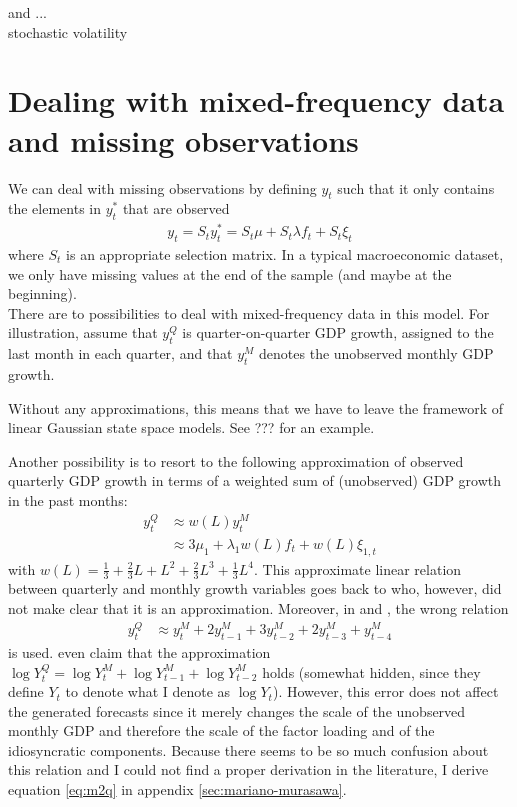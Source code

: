 
\citet{LucianiRicci2014} and \citet{DAgostinoEtal2016} ... \\

\citet{MarcellinoEtal2016} stochastic volatility

\section{Dealing with mixed-frequency data and missing observations}

We can deal with missing observations by defining $y_t$ such that it only contains the elements in $y_t^*$ that are observed
\begin{align}
y_t = S_t y^*_t = S_t\mu + S_t \lambda f_t + S_t \xi_t
\end{align}
where $S_t$ is an appropriate selection matrix. In a typical macroeconomic dataset, we only have missing values at the end of the sample (and maybe at the beginning). \\


There are to possibilities to deal with mixed-frequency data in this model. For illustration, assume that $y_t^Q$ is quarter-on-quarter GDP growth, assigned to the last month in each quarter, and that $y_t^M$ denotes the unobserved monthly GDP growth.  

\citet{ProiettiMoauro2006}
Without any approximations, this means that we have to leave the framework of linear Gaussian state space models. See ??? for an example.

Another possibility is to resort to the following approximation of observed quarterly GDP growth in terms of a weighted sum of (unobserved) GDP growth in the past months:
\begin{align}
y^Q_{t} &\approx w(L) y^M_{t} \\ \label{eq:m2q}
&\approx 3\mu_1 + \lambda_1 w(L) f_t + w(L) \xi_{1,t}
\end{align}
with $w(L) = \frac{1}{3} + \frac{2}{3} L + L^2 + \frac{2}{3} L^3 + \frac{1}{3} L^4$. This approximate linear relation between quarterly and monthly growth variables goes back to \citet{MarianoMurasawa2003} who, however, did not make clear that it is an approximation. Moreover, in \citet{LucianiRicci2014} and \citet{BanburaEtal2013}, the wrong relation
\begin{align*}
y^Q_{t} &\approx y^M_{t} + 2y^M_{t-1} + 3y^M_{t-2} + 2y^M_{t-3} + y^M_{t-4}
\end{align*}
is used. \citet[p. 239]{LucianiRicci2014} even claim that the approximation $\log Y_t^Q = \log Y_t^M + \log Y_{t-1}^M + \log Y_{t-2}^M$ holds (somewhat hidden, since they define $Y_t$ to denote what I denote as $\log Y_t$). However, this error does not affect the generated forecasts since it merely changes the scale of the unobserved monthly GDP and therefore the scale of the factor loading and of the idiosyncratic components. Because there seems to be so much confusion about this relation and I could not find a proper derivation in the literature, I derive equation \ref{eq:m2q} in appendix \ref{sec:mariano-murasawa}.\\

